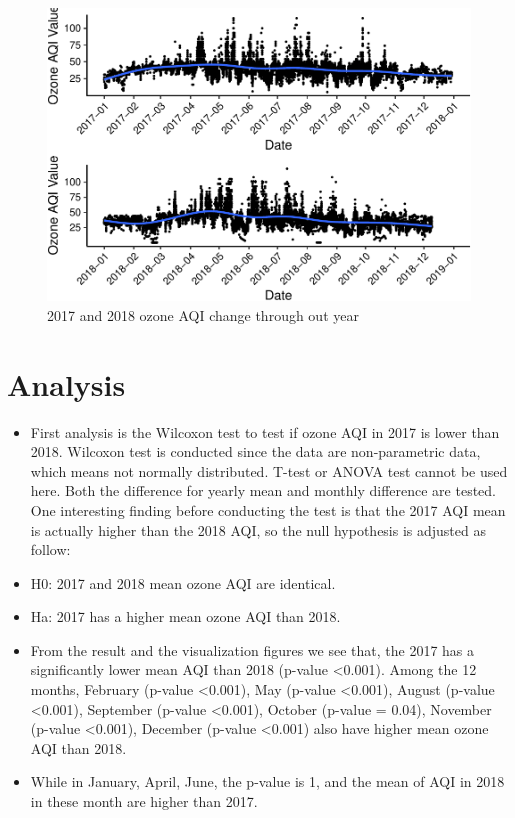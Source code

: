\documentclass[12pt,]{article}
\begin{document}
\begin{figure}
\centering
\includegraphics{Xia_ENV_872_Project_files/figure-latex/exploration 5-1.pdf}
\caption{2017 and 2018 ozone AQI change through out year}
\end{figure}

\newpage

\section{Analysis}\label{analysis}

\begin{itemize}
\item[] First analysis is the Wilcoxon test to test if ozone AQI in 2017 is lower than 2018. Wilcoxon test is conducted since the data are non-parametric data, which means not normally distributed. T-test or ANOVA test cannot be used here. Both the difference for yearly mean and monthly difference are tested. One interesting finding before conducting the test is that the 2017 AQI mean is actually higher than the 2018 AQI, so the null hypothesis is adjusted as follow:  
\item[]H0: 2017 and 2018 mean ozone AQI are identical.  \
\item[]Ha: 2017 has a higher mean ozone AQI than 2018.  \
\item[]From the result and the visualization figures we see that, the 2017 has a significantly lower mean AQI than 2018 (p-value <0.001). Among the 12 months, February (p-value <0.001), May (p-value <0.001), August (p-value <0.001), September (p-value <0.001), October (p-value = 0.04), November (p-value <0.001), December (p-value <0.001) also have higher mean ozone AQI than 2018.
\item[]While in January, April, June, the p-value is 1, and the mean of AQI in 2018 in these month are higher than 2017.
\end{itemize}
\end{document}
